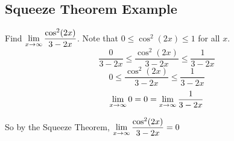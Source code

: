 \subsection*{Squeeze Theorem Example}

Find $\displaystyle \lim_{x\to\infty}\dfrac{\cos^2(2x)}{3-2x}$. Note that $0\leq \cos^2(2x)\leq 1$ for all $x$.\\

\[\dfrac{0}{3-2x}\leq \dfrac{\cos^2(2x)}{3-2x}\leq\dfrac{1}{3-2x}\]
\[ 0 \leq \dfrac{\cos^2(2x)}{3-2x} \leq \dfrac{1}{3-2x} \]
\[ \displaystyle \lim_{x\to\infty} 0 = 0 = \displaystyle \lim_{x\to\infty} \dfrac{1}{3-2x} \]

So by the Squeeze Theorem, $\displaystyle \lim_{x\to\infty} \dfrac{\cos^2(2x)}{3-2x}=0$
